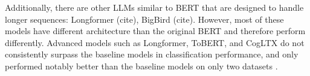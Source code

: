 Additionally, there are other LLMs similar to BERT that are designed to handle longer sequences: Longformer (cite), BigBird (cite). However, most of these models have different architecture than the original BERT and therefore perform differently.
Advanced models such as Longformer, ToBERT, and CogLTX do not consistently surpass the baseline models in classification performance, and only performed notably better than the baseline models on only two datasets \cite{park-2022-efficient}.


\lipsum[66]

